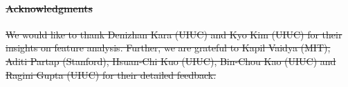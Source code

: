 \documentclass[manuscript,screen,review]{acmart} %
\newcommand{\eg}{{\it e.g.,}\xspace}
\newcommand{\ie}{{\it i.e.,}\xspace}
\newcommand{\ca}{{\it (a) }}
\newcommand{\cb}{{\it (b) }}
\newcommand{\cc}{{\it (c) }}
\newcommand{\cout}{$C_{\text{out}}$\xspace}
\newcommand{\aout}{$A_{\text{out}}$\xspace}
\providecommand{\DIFdel}[1]{{\protect\color{red}\sout{#1}}}                      %
\providecommand{\DIFdelend}{} %
\DeclareRobustCommand{\DIFdelend}{\DIFOaddend \let\includegraphics\DIFOincludegraphics} %
\begin{document}
\paragraph{\DIFdel{Acknowledgments}}%
\addtocounter{paragraph}{-1}%
\DIFdel{We would like to thank Denizhan Kara (UIUC) and Kyo Kim (UIUC) for their insights on feature analysis. Further, we are grateful to Kapil Vaidya (MIT), Aditi Partap (Stanford), Hsuan-Chi Kuo (UIUC), Bin-Chou Kao (UIUC) and Ragini Gupta (UIUC) for their detailed feedback. }%
\DIFdelend 
\end{document}
